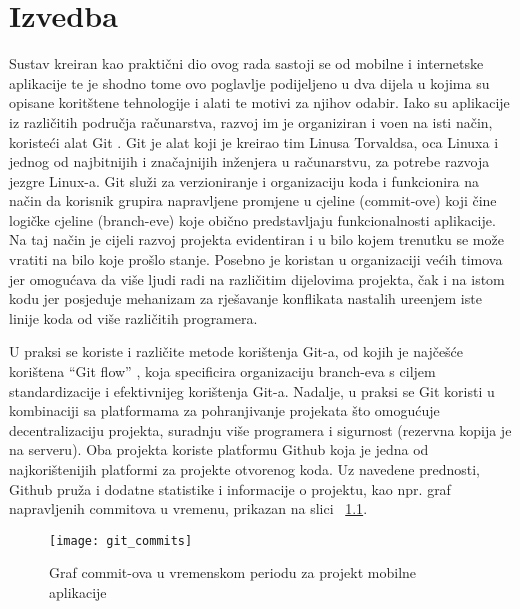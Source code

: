 
\chapter{Izvedba}

Sustav kreiran kao prakti\v{c}ni dio ovog rada sastoji se od mobilne i internetske aplikacije te je shodno tome ovo poglavlje podijeljeno u dva dijela u kojima su opisane korit\v{s}tene tehnologije i alati te motivi za njihov odabir. Iako su aplikacije iz razli\v{c}itih podru\v{c}ja ra\v{c}unarstva, razvoj im je organiziran i vo\dj en na isti na\v{c}in, koriste\'{c}i alat Git \cite{git}. Git je alat koji je kreirao tim Linusa Torvaldsa, oca Linuxa i jednog od najbitnijih i zna\v{c}ajnijih in\v{z}enjera u ra\v{c}unarstvu, za potrebe razvoja jezgre Linux-a. Git slu\v{z}i za verzioniranje i organizaciju koda i funkcionira na na\v{c}in da korisnik grupira napravljene promjene u cjeline (commit-ove) koji \v{c}ine logi\v{c}ke cjeline (branch-eve) koje obi\v{c}no predstavljaju funkcionalnosti aplikacije. Na taj na\v{c}in je cijeli razvoj projekta evidentiran i u bilo kojem trenutku se mo\v{z}e vratiti na bilo koje pro\v{s}lo stanje. Posebno je koristan u organizaciji ve\'{c}ih timova jer omogu\'{c}ava da vi\v{s}e ljudi radi na razli\v{c}itim dijelovima projekta, \v{c}ak i na istom kodu jer posjeduje mehanizam za rje\v{s}avanje konflikata nastalih ure\dj enjem iste linije koda od vi\v{s}e razli\v{c}itih programera. 

U praksi se koriste i razli\v{c}ite metode kori\v{s}tenja Git-a, od kojih je naj\v{c}e\v{s}\'{c}e kori\v{s}tena ``Git flow'' \cite{git_flow}, koja specificira organizaciju branch-eva s ciljem standardizacije i efektivnijeg kori\v{s}tenja Git-a. Nadalje, u praksi se Git koristi u kombinaciji sa platformama za pohranjivanje projekata \v{s}to omogu\'{c}uje decentralizaciju projekta, suradnju vi\v{s}e programera i sigurnost (rezervna kopija je na serveru). Oba projekta koriste platformu Github \cite{github} koja je jedna od najkori\v{s}tenijih platformi za projekte otvorenog koda. Uz navedene prednosti, Github pru\v{z}a i dodatne statistike i informacije o projektu, kao npr. graf napravljenih commitova u vremenu, prikazan na slici  ~\ref{fig:commits}.

\begin{figure}[!htbp]
	\begin{center}
 \texttt{[image: git\_commits]}
 \caption{Graf commit-ova u vremenskom periodu za projekt mobilne aplikacije}
 \label{fig:commits}
	\end{center}
\end{figure}

